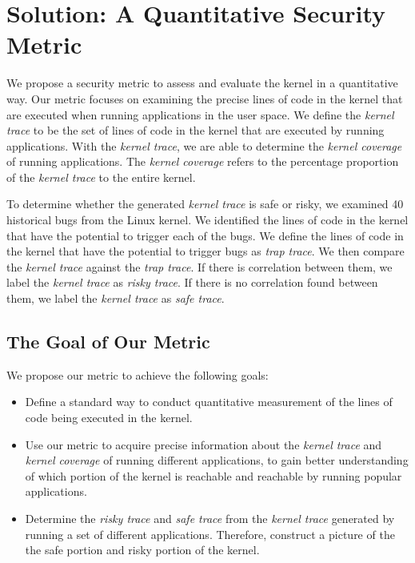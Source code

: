 \section{Solution: A Quantitative Security Metric}
\label{sec.solution}

We propose a security metric to assess and evaluate the kernel in a quantitative way. 
Our metric focuses on examining the precise lines of code in the kernel that are executed 
when running applications in the user space. We define the \textit{kernel trace} to be the 
set of lines of code in the kernel that are executed by running applications. With the \textit{kernel trace}, 
we are able to determine the \textit{kernel coverage} of running applications. The \textit{kernel coverage} 
refers to the percentage proportion of the \textit{kernel trace} to the entire kernel. 

To determine whether the generated \textit{kernel trace} is safe or risky, we examined 40 historical bugs from
the Linux kernel. We identified the lines of code in the kernel that have the potential to trigger each of the bugs.
We define the lines of code in the kernel that have the potential to trigger bugs as \textit{trap trace}.
We then compare the \textit{kernel trace} against the \textit{trap trace}. If there is correlation between 
them, we label the \textit{kernel trace} as \textit{risky trace}. If there is no correlation found between them, 
we label the \textit{kernel trace} as \textit{safe trace}.

\subsection{The Goal of Our Metric}
We propose our metric to achieve the following goals:
\begin{itemize}
\item Define a standard way to conduct quantitative measurement of the lines of code being executed 
in the kernel. 
\item Use our metric to acquire precise information about the \textit{kernel trace} and \textit{kernel coverage} 
of running different applications, to gain better understanding of which portion of the kernel is reachable and 
reachable by running popular applications. 
\item Determine the \textit{risky trace} and \textit{safe trace} from the \textit{kernel trace} generated by
running a set of different applications. Therefore, construct a picture of the the safe portion and risky portion
of the kernel. 
\end{itemize}

